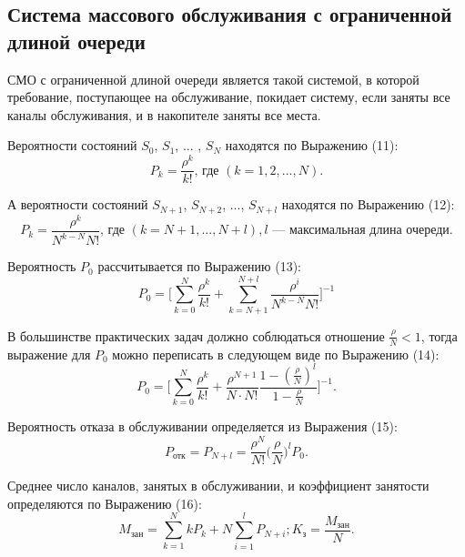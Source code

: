 \documentclass[14pt]{extarticle}
\begin{document}
    \subsection{Система массового обслуживания с ограниченной длиной очереди}

    СМО с ограниченной длиной очереди является такой системой, в которой требование, поступающее на обслуживание, покидает систему, если заняты все каналы обслуживания, и в накопителе заняты все места.

    Вероятности состояний $S_0$, $S_1$, ... , $S_N$ находятся по Выражению (11):
    \begin{equation}
        P_k = \frac{\rho^k}{k!}\text{, где }(k = 1, 2, ..., N).
    \end{equation}

    А вероятности состояний $S_{N+1}$, $S_{N+2}$, ..., $S_{N + l}$ находятся  по Выражению (12):
    \begin{equation}
        P_k = \frac{\rho^k}{N^{k - N} N!}\text{, где }(k = N + 1, ..., N + l), l\text{ --- максимальная длина очереди}.
    \end{equation}

    Вероятность $P_0$ рассчитывается  по Выражению (13):
    \begin{equation}
        P_0 = \Bigg[ \sum_{k = 0}^N \frac{\rho^k}{k!} + \sum_{k = N + 1}^{N + l} \frac{\rho^i}{N^{k - N} N!} \Bigg]^{-1}
    \end{equation}

    В большинстве практических задач должно соблюдаться отношение $\frac{\rho}{N} < 1$, тогда выражение для $P_0$ можно переписать в следующем виде  по Выражению (14):
    \begin{equation}
        P_0 = \Bigg[ \sum_{k = 0}^N \frac{\rho^k}{k!} + \frac{\rho^{N+1}}{N \cdot N!} \frac{1 - (\frac{\rho}{N})^l}{1 - \frac{\rho}{N}} \Bigg]^{-1}.
    \end{equation}

    Вероятность отказа в обслуживании определяется из Выражения (15):
    \begin{equation}
        P_{\text{отк}} = P_{N+l} = \frac{\rho^N}{N!} \Bigg( \frac{\rho}{N} \Bigg)^l P_0.
    \end{equation}

    Среднее число каналов, занятых в обслуживании, и коэффициент занятости определяются  по Выражению (16):
    \begin{equation}
        M_{\text{зан}} = \sum_{k = 1}^N k P_k + N \sum_{i = 1}^l P_{N + i}; K_{\text{з}} = \frac{M_{\text{зан}}}{N}.
    \end{equation}
\end{document}
